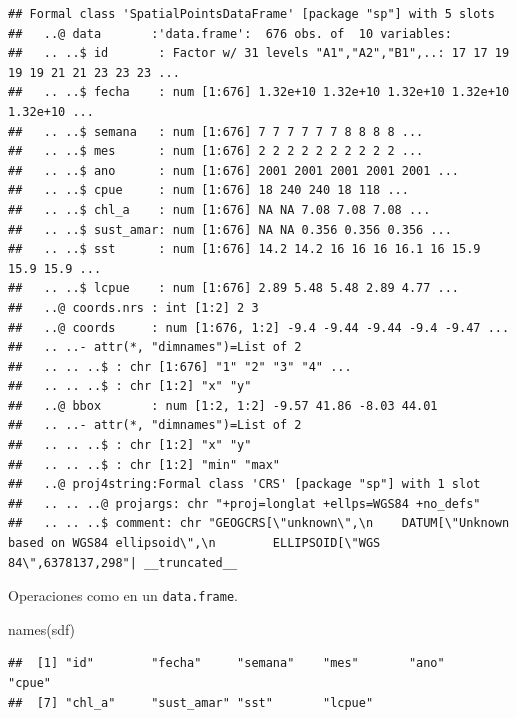 \documentclass[
  spanish,
]{book}
\newenvironment{Shaded}{\begin{snugshade}}{\end{snugshade}}
\newcommand{\CommentTok}[1]{\textcolor[rgb]{0.56,0.35,0.01}{\textit{#1}}}
\newcommand{\FunctionTok}[1]{\textcolor[rgb]{0.00,0.00,0.00}{#1}}
\newcommand{\NormalTok}[1]{#1}
\newcommand{\SpecialCharTok}[1]{\textcolor[rgb]{0.00,0.00,0.00}{#1}}
\theoremstyle{break}
\theoremstyle{definition}
\theoremstyle{definition}
\theoremstyle{definition}
\theoremstyle{definition}
\theoremstyle{remark}
\begin{document}
\begin{verbatim}
## Formal class 'SpatialPointsDataFrame' [package "sp"] with 5 slots
##   ..@ data       :'data.frame':  676 obs. of  10 variables:
##   .. ..$ id       : Factor w/ 31 levels "A1","A2","B1",..: 17 17 19 19 19 21 21 23 23 23 ...
##   .. ..$ fecha    : num [1:676] 1.32e+10 1.32e+10 1.32e+10 1.32e+10 1.32e+10 ...
##   .. ..$ semana   : num [1:676] 7 7 7 7 7 7 8 8 8 8 ...
##   .. ..$ mes      : num [1:676] 2 2 2 2 2 2 2 2 2 2 ...
##   .. ..$ ano      : num [1:676] 2001 2001 2001 2001 2001 ...
##   .. ..$ cpue     : num [1:676] 18 240 240 18 118 ...
##   .. ..$ chl_a    : num [1:676] NA NA 7.08 7.08 7.08 ...
##   .. ..$ sust_amar: num [1:676] NA NA 0.356 0.356 0.356 ...
##   .. ..$ sst      : num [1:676] 14.2 14.2 16 16 16 16.1 16 15.9 15.9 15.9 ...
##   .. ..$ lcpue    : num [1:676] 2.89 5.48 5.48 2.89 4.77 ...
##   ..@ coords.nrs : int [1:2] 2 3
##   ..@ coords     : num [1:676, 1:2] -9.4 -9.44 -9.44 -9.4 -9.47 ...
##   .. ..- attr(*, "dimnames")=List of 2
##   .. .. ..$ : chr [1:676] "1" "2" "3" "4" ...
##   .. .. ..$ : chr [1:2] "x" "y"
##   ..@ bbox       : num [1:2, 1:2] -9.57 41.86 -8.03 44.01
##   .. ..- attr(*, "dimnames")=List of 2
##   .. .. ..$ : chr [1:2] "x" "y"
##   .. .. ..$ : chr [1:2] "min" "max"
##   ..@ proj4string:Formal class 'CRS' [package "sp"] with 1 slot
##   .. .. ..@ projargs: chr "+proj=longlat +ellps=WGS84 +no_defs"
##   .. .. ..$ comment: chr "GEOGCRS[\"unknown\",\n    DATUM[\"Unknown based on WGS84 ellipsoid\",\n        ELLIPSOID[\"WGS 84\",6378137,298"| __truncated__
\end{verbatim}

Operaciones como en un \texttt{data.frame}.

\begin{Shaded}
\begin{Highlighting}[]
\FunctionTok{names}\NormalTok{(sdf)}
\end{Highlighting}
\end{Shaded}

\begin{verbatim}
##  [1] "id"        "fecha"     "semana"    "mes"       "ano"       "cpue"     
##  [7] "chl_a"     "sust_amar" "sst"       "lcpue"
\end{verbatim}

\begin{Shaded}
\end{Shaded}
\end{document}
